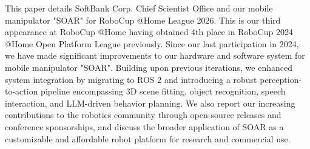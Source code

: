 \documentclass[runningheads,a4paper]{llncs}
\begin{document}



This paper details SoftBank Corp. Chief Scientist Office and our mobile manipulator "SOAR" for RoboCup @Home League 2026.
This is our third appearance at RoboCup @Home having obtained 4th place in RoboCup 2024 @Home Open Platform League previously.
Since our last participation in 2024, we have made significant improvements to our hardware and software system for mobile manipulator "SOAR".
Building upon previous iterations, we enhanced system integration by migrating to ROS 2 and introducing a robust perception-to-action pipeline encompassing 3D scene fitting, object recognition, speech interaction, and LLM-driven behavior planning.
We also report our increasing contributions to the robotics community through open-source releases and conference sponsorships, and discuss the broader application of SOAR as a customizable and affordable robot platform for research and commercial use.
\end{document}
